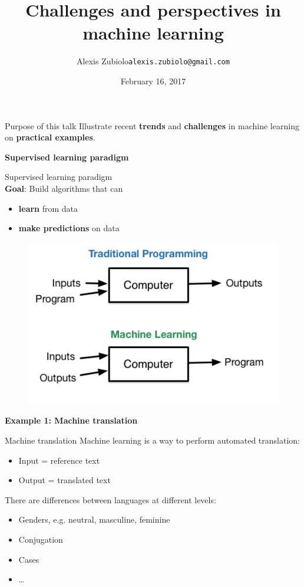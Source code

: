 \documentclass{beamer}
\title[Course presentation]{Challenges and perspectives in machine learning}
\author{Alexis Zubiolo\newline\texttt{alexis.zubiolo@gmail.com}}
\institute{Data Science Team Lead @ Adcash}
\date{February 16, 2017}
\begin{document}
\begin{frame}
  \titlepage
\end{frame}

\begin{frame}{Purpose of this talk}
Illustrate recent \textbf{trends} and \textbf{challenges} in machine learning on \textbf{practical examples}.
\end{frame}

\begin{frame}
\center
\Huge
\textbf{Supervised learning paradigm}
\end{frame}

\begin{frame}{Supervised learning paradigm}
~\\
\textbf{Goal}: Build algorithms that can 
\begin{itemize}
	\item \textbf{learn} from data
	\item \textbf{make predictions} on data
\end{itemize}
\vfill
\pause
\begin{figure}
\centering
\includegraphics[width=\textwidth]{images/ml_vs_traditional.png}
\end{figure}
\end{frame}

\begin{frame}
\center
\Huge
\textbf{Example 1: Machine translation}
\end{frame}

\begin{frame}{Machine translation}
Machine learning is a way to perform automated translation:
\begin{itemize}
	\item Input = reference text
	\item Output = translated text
\end{itemize}
\pause
\vfill
There are differences between languages at different levels:
\begin{itemize}
	\item Genders, e.g. neutral, masculine, feminine
	\item Conjugation
	\item Cases
	\item \dots
\end{itemize}
\end{frame}
\end{document}
